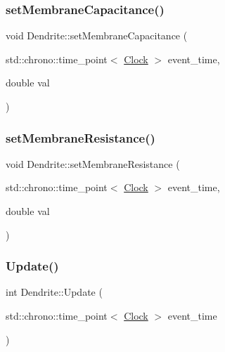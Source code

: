 \mbox{\label{classDendrite_a6fed149ffe00cf781a41a9f260f8eeb2}} 
\subsubsection{\texorpdfstring{set\+Membrane\+Capacitance()}{setMembraneCapacitance()}}
{\footnotesize\ttfamily void Dendrite\+::set\+Membrane\+Capacitance (\begin{DoxyParamCaption}\item[{std\+::chrono\+::time\+\_\+point$<$ \mbox{\hyperlink{universe_8h_a0ef8d951d1ca5ab3cfaf7ab4c7a6fd80}{Clock}} $>$}]{event\+\_\+time,  }\item[{double}]{val }\end{DoxyParamCaption})\hspace{0.3cm}{\ttfamily [inline]}}

\mbox{\label{classDendrite_af6141643bf2c85404ae9c320611d1d31}} 
\subsubsection{\texorpdfstring{set\+Membrane\+Resistance()}{setMembraneResistance()}}
{\footnotesize\ttfamily void Dendrite\+::set\+Membrane\+Resistance (\begin{DoxyParamCaption}\item[{std\+::chrono\+::time\+\_\+point$<$ \mbox{\hyperlink{universe_8h_a0ef8d951d1ca5ab3cfaf7ab4c7a6fd80}{Clock}} $>$}]{event\+\_\+time,  }\item[{double}]{val }\end{DoxyParamCaption})\hspace{0.3cm}{\ttfamily [inline]}}

\mbox{\label{classDendrite_a2e7bfde37bc7aec2547253ad038aaa04}} 
\subsubsection{\texorpdfstring{Update()}{Update()}}
{\footnotesize\ttfamily int Dendrite\+::\+Update (\begin{DoxyParamCaption}\item[{std\+::chrono\+::time\+\_\+point$<$ \mbox{\hyperlink{universe_8h_a0ef8d951d1ca5ab3cfaf7ab4c7a6fd80}{Clock}} $>$}]{event\+\_\+time }\end{DoxyParamCaption})}



